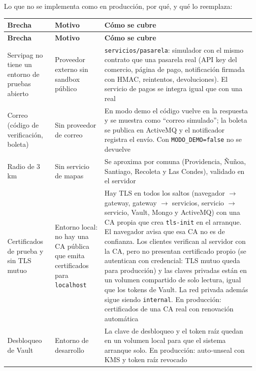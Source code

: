 Lo que no se implementa como en producción, por qué, y qué lo reemplaza:


{\small
\setlength{\tabcolsep}{3pt}\renewcommand{\arraystretch}{1.15}
\begin{longtable}{|>{\raggedright\arraybackslash}p{}|>{\raggedright\arraybackslash}p{}|>{\raggedright\arraybackslash}p{}|}
\hline
\textbf{Brecha} & \textbf{Motivo} & \textbf{Cómo se cubre} \\ \hline
\endfirsthead
\hline
\textbf{Brecha} & \textbf{Motivo} & \textbf{Cómo se cubre} \\ \hline
\endhead
Servipag no tiene un entorno de pruebas abierto & Proveedor externo sin sandbox público & \texttt{servicios/\allowbreak{}pasarela}: simulador con el mismo contrato que una pasarela real (API key del comercio, página de pago, notificación firmada con HMAC, reintentos, devoluciones). El servicio de pagos se integra igual que con una real \\ \hline
Correo (código de verificación, boleta) & Sin proveedor de correo & En modo demo el código vuelve en la respuesta y se muestra como “correo simulado”; la boleta se publica en ActiveMQ y el notificador registra el envío. Con \texttt{MODO\_\allowbreak{}DEMO=\allowbreak{}false} no se devuelve \\ \hline
Radio de 3 km & Sin servicio de mapas & Se aproxima por comuna (Providencia, Ñuñoa, Santiago, Recoleta y Las Condes), validado en el servidor \\ \hline
Certificados de prueba y sin TLS mutuo & Entorno local: no hay una CA pública que emita certificados para \texttt{localhost} & Hay TLS en todos los saltos (navegador $\rightarrow$ gateway, gateway $\rightarrow$ servicios, servicio $\rightarrow$ servicio, Vault, Mongo y ActiveMQ) con una CA propia que crea \texttt{tls-\allowbreak{}init} en el arranque. El navegador avisa que esa CA no es de confianza. Los clientes verifican al servidor con la CA, pero no presentan certificado propio (se autentican con credencial: TLS mutuo queda para producción) y las claves privadas están en un volumen compartido de solo lectura, igual que los tokens de Vault. La red privada además sigue siendo \texttt{internal}. En producción: certificados de una CA real con renovación automática \\ \hline
Desbloqueo de Vault & Entorno de desarrollo & La clave de desbloqueo y el token raíz quedan en un volumen local para que el sistema arranque solo. En producción: auto-unseal con KMS y token raíz revocado \\ \hline

\end{longtable}}
